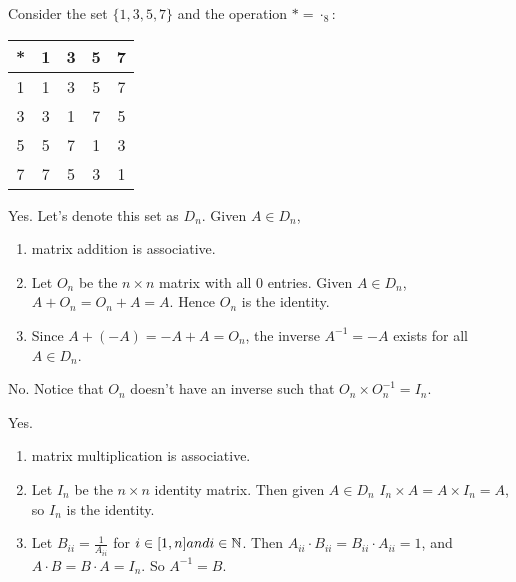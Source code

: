 \documentclass[12pt]{article}
\begin{document}
\begin{problem}[4.8]
Consider the set $\{1,3,5,7\} $ and the operation $*=\cdot_{8} $:
\begin{table}[htpb]
	\centering
	\begin{tabular}{c||c|c|c|c}
		*&1&3&5&7\\
		\hline
		\hline
		1&1&3&5&7\\
		\hline
		3&3&1&7&5\\
		\hline
		5&5&7&1&3\\
		\hline
		7&7&5&3&1
	\end{tabular}
\end{table}
\end{problem}

\begin{problem}[4.11]
Yes. Let's denote this set as $D_n$. Given $A \in D_n$, 
\begin{enumerate}[label=(\roman*)]
	\item matrix addition is associative.
	\item Let $O_n$ be the $n \times n$ matrix with all $0$ entries. Given  $A \in D_n$, $A+ O_n=O_n+A =A$. Hence $O_n$ is the identity.
	\item Since $A+(-A) = -A +A = O_n$, the inverse $A^{-1} = -A$ exists for all $ A \in D_n$.
\end{enumerate}
\end{problem}

\begin{problem}[4.12]
	No. Notice that $O_n$ doesn't have an inverse such that $O_n \times O_n^{-1} = I_n$.
\end{problem}

\begin{problem}[4.13]
Yes. 
\begin{enumerate}[label=(\roman*)]
	\item matrix multiplication is associative.
	\item Let $I_n$ be the $n \times n$ identity matrix. Then given $A \in D_n$ $I_n \times  A = A \times I_n = A$, so $I_n$ is the identity.
	\item Let $B_{ii} = \frac{1}{A_{ii}}$ for $i \in [1,n] and i \in \mathbb{N}$. Then $A_{ii} \cdot B_{ii} = B_{ii} \cdot A_{ii} = 1$, and $A \cdot B = B \cdot A = I_n$. So $A^{-1} = B$.
\end{enumerate}
\end{problem}

\end{document}
